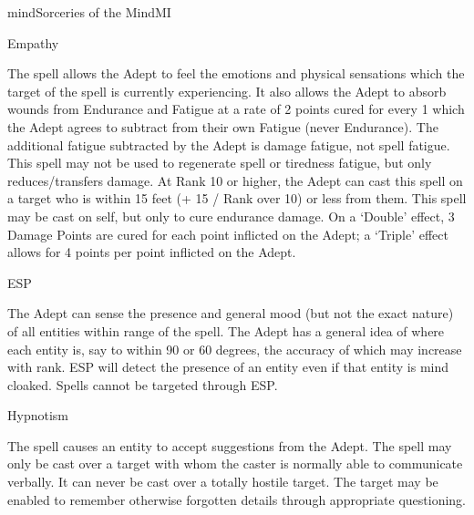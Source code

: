 \begin{college}[1.6]{mind}{Sorceries of the Mind}{MI}
\begin{spell}[G-3]{Empathy}

\begin{effects}
The spell allows the Adept to feel the emotions and physical
sensations which the target of the spell is currently experiencing. It
also allows the Adept to absorb wounds from Endurance and Fatigue at a
rate of 2 points cured for every 1 which the Adept agrees to subtract
from their own Fatigue (never Endurance). The additional fatigue
subtracted by the Adept is damage fatigue, not spell fatigue. This
spell may not be used to regenerate spell or tiredness fatigue, but
only reduces/transfers damage. At Rank 10 or higher, the Adept can
cast this spell on a target who is within 15 feet (+ 15 / Rank over
10) or less from them. This spell may be cast on self, but only to
cure endurance damage. On a `Double' effect, 3 Damage Points are cured
for each point inflicted on the Adept; a `Triple' effect allows for 4
points per point inflicted on the Adept.
\end{effects}
\end{spell}

\begin{spell}[G-4]{ESP}

\begin{effects}
The Adept can sense the presence and general mood (but not the exact
nature) of all entities within range of the spell. The Adept has a
general idea of where each entity is, say to within 90 or 60 degrees,
the accuracy of which may increase with rank. ESP will detect the
presence of an entity even if that entity is mind cloaked. Spells
cannot be targeted through ESP.
\end{effects}
\end{spell}

\begin{spell}[G-5]{Hypnotism}

\begin{effects}
The spell causes an entity to accept suggestions from the Adept.  The
spell may only be cast over a target with whom the caster is normally
able to communicate verbally. It can never be cast over a totally
hostile target. The target may be enabled to remember otherwise
forgotten details through appropriate questioning.


\end{effects}
\end{spell}
\end{college}

